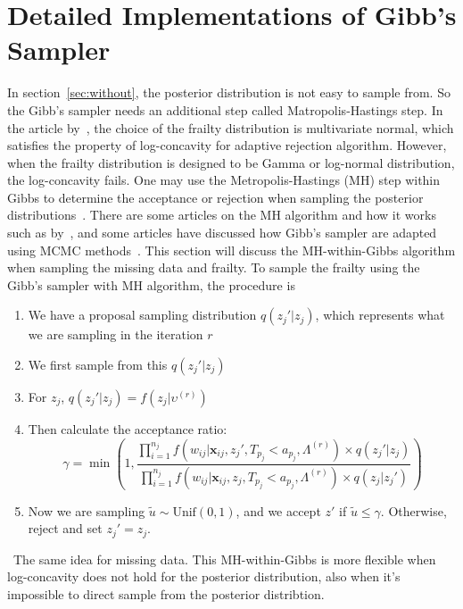 \documentclass[preprint,12pt]{elsarticle}
\begin{document}
\section{Detailed Implementations of Gibb's Sampler}
In section~\ref{sec:without}, the posterior distribution is not easy to sample from. 
So the Gibb's sampler needs an additional step called Matropolis-Hastings step. 
In the article by~\citet{herring2002frailty}, the choice of the frailty distribution is multivariate normal, which satisfies the property of log-concavity for adaptive rejection algorithm. 
However, when the frailty distribution is designed to be Gamma or log-normal distribution, the log-concavity fails. 
One may use the Metropolis-Hastings (MH) step within Gibbs to determine the acceptance or rejection when sampling the posterior distributions~\cite{griffin2013adaptive}. 
There are some articles on the MH algorithm and how it works such as by~\citet{10.1214/105051606000000286}, and some articles have discussed how Gibb's sampler are adapted using MCMC methods~\cite{10.1214/11-AAP806}. 
This section will discuss the MH-within-Gibbs algorithm when sampling the missing data and frailty. 
To sample the frailty using the Gibb's sampler with MH algorithm, the procedure is 
\begin{enumerate} 
    \item We have a proposal sampling distribution $q(z_j'|z_j)$, which represents what we are sampling in the iteration $r$
    \item We first sample from this $q(z_j'|z_j)$
    \item For $z_j$, $q(z_j'|z_j)=f(z_j|\upsilon^{(r)})$
    \item Then calculate the acceptance ratio: 
          \begin{equation} 
            \gamma=\min \left (1,\frac{\prod_{i=1}^{n_j}f(w_{ij}|\mathbf{x}_{ij}, z_j', T_{p_j}<a_{p_j}, \Lambda^{(r)})\times q(z_j'|z_j)}{\prod_{i=1}^{n_j}f(w_{ij}|\mathbf{x}_{ij}, z_j, T_{p_j}<a_{p_j}, \Lambda^{(r)})\times q(z_j|z_j')} \right )
          \end{equation}
    \item Now we are sampling $\tilde{u}\sim \text{Unif}(0,1)$, and we accept $z'$ if $\tilde{u}\leq \gamma$. Otherwise, reject and set $z_j'=z_j$. 
\end{enumerate}\
The same idea for missing data. 
This MH-within-Gibbs is more flexible when log-concavity does not hold for the posterior distribution, also when it's impossible to direct sample from the posterior distribtion. 
\end{document}
